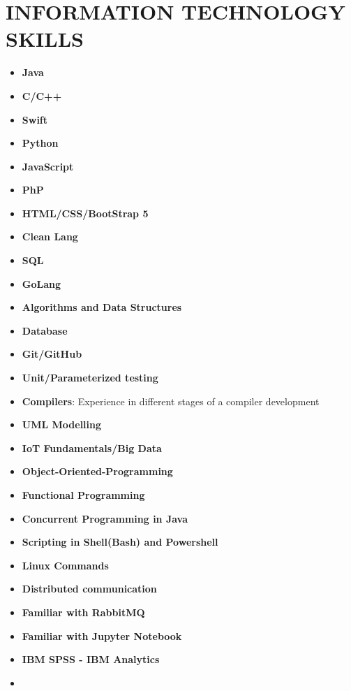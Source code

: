 \documentclass[11 pt,oneside,a4paper,titlepage]{article}
\begin{document}
{\begin{minipage}{11.3cm}
        \section*{{\faCode} INFORMATION TECHNOLOGY SKILLS}
        \vspace*{-0.5cm}
        \hfill \break
        \begin{multicols}{2}    
        \begin{itemize}
        \footnotesize
            \item \textbf{Java}
            \item \textbf{C/C++}
            \item \textbf{Swift}
            \item \textbf{Python}
            \item \textbf{JavaScript}
            \item \textbf{PhP}
            \item \textbf{HTML/CSS/BootStrap 5}
            \item \textbf{Clean Lang}
            \item \textbf{SQL}
            \item \textbf{GoLang}
            \item \textbf{Algorithms and Data Structures}
            \item \textbf{Database}
            \item \textbf{Git/GitHub}
            \item \textbf{Unit/Parameterized testing}
            \item \textbf{Compilers}: Experience in different stages of a compiler development
            \item \textbf{UML Modelling}
            \item \textbf{IoT Fundamentals/Big Data}
            \item \textbf{Object-Oriented-Programming}
            \item \textbf{Functional Programming}
            \item \textbf{Concurrent Programming in Java}
            \item \textbf{Scripting in Shell(Bash) and Powershell}
            \item \textbf{Linux Commands}
            \item \textbf{Distributed communication}
            \item \textbf{Familiar with RabbitMQ}
            \item \textbf{Familiar with Jupyter Notebook}
            \item \textbf{IBM SPSS - IBM Analytics}
            
            \item[\vspace{\fill}]
        \end{itemize}
        \end{multicols}
    
        
            
    \end{minipage}} %
\end{document}
